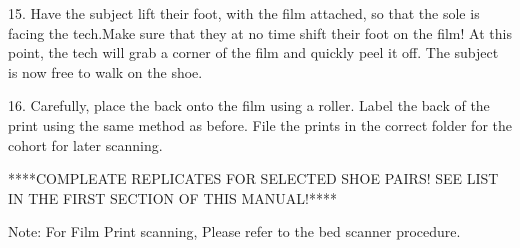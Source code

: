 15. Have the subject lift their foot, with the film attached, so that the sole is facing the tech.Make sure that they at no time shift their foot on the film! At this point, the tech will grab a corner of the film and quickly peel it off. The subject is now free to walk on the shoe. 

16. Carefully, place the back onto the film using a roller. Label the back of the print using the same method as before. File the prints in the correct folder for the cohort for later scanning.

****COMPLEATE REPLICATES FOR SELECTED SHOE PAIRS! SEE LIST IN THE FIRST SECTION OF THIS MANUAL!****

Note: For Film Print scanning, Please refer to the bed scanner procedure. 





